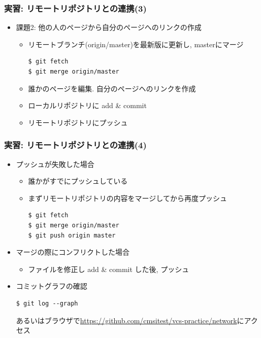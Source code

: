 \begin{frame}[t,fragile]
  \frametitle{実習: リモートリポジトリとの連携(3)}
  \begin{itemize}
  \item 課題2: 他の人のページから自分のページへのリンクの作成
    \begin{itemize}
      \item リモートブランチ(origin/master)を最新版に更新し, masterにマージ
\begin{lstlisting}
$ git fetch
$ git merge origin/master
\end{lstlisting}
      \item 誰かのページを編集. 自分のページヘのリンクを作成
      \item ローカルリポジトリに add \& commit
      \item リモートリポジトリにプッシュ
    \end{itemize}
  \end{itemize}
\end{frame}

\begin{frame}[t,fragile]
  \frametitle{実習: リモートリポジトリとの連携(4)}
  \begin{itemize}
  \item プッシュが失敗した場合
    \begin{itemize}
      \item 誰かがすでにプッシュしている
      \item まずリモートリポジトリの内容をマージしてから再度プッシュ
\begin{lstlisting}
$ git fetch
$ git merge origin/master
$ git push origin master
\end{lstlisting}
    \end{itemize}
  \item マージの際にコンフリクトした場合
    \begin{itemize}
      \item ファイルを修正し add \& commit した後, プッシュ
    \end{itemize}
  \item コミットグラフの確認
\begin{lstlisting}
$ git log --graph
\end{lstlisting}
    あるいはブラウザで\url{https://github.com/cmsitest/vcs-practice/network}にアクセス
  \end{itemize}
\end{frame}

